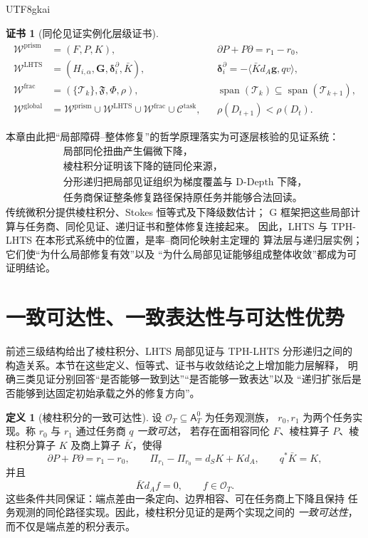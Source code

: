 \documentclass[12pt]{report}
\theoremstyle{definition}
\newtheorem{definition}{定义}[chapter]
\newtheorem{Certificate}{证书}[chapter]
\begin{document}
\begin{CJK*}{UTF8}{gkai}
\begin{Certificate}[同伦见证实例化层级证书]
\label{cert:witness-instance-hierarchy}
\[
\boxed{
\begin{aligned}
\mathcal W^{\mathrm{prism}}
&=(F,P,K),
&&\partial P+P\partial=r_1-r_0,\\
\mathcal W^{\mathrm{LHTS}}
&=(H_{i,\alpha},\mathbf G,\boldsymbol\delta_i^\partial,
   \bar K),
&&\boldsymbol\delta_i^\partial
  =-\langle\bar Kd_A\mathbf g,qv\rangle,\\
\mathcal W^{\mathrm{frac}}
&=(\{\mathcal T_k\},\mathfrak F,\Phi,\rho),
&&\operatorname{span}(\mathcal T_k)
  \subseteq\operatorname{span}(\mathcal T_{k+1}),\\
\mathcal W^{\mathrm{global}}
&=\mathcal W^{\mathrm{prism}}
  \cup\mathcal W^{\mathrm{LHTS}}
  \cup\mathcal W^{\mathrm{frac}}
  \cup\mathcal C^{\mathrm{task}},
&&\rho(D_{t+1})<\rho(D_t).
\end{aligned}}
\]
\end{Certificate}

本章由此把“局部障碍--整体修复”的哲学原理落实为可逐层核验的见证系统：
\[
\boxed{
\begin{gathered}
\text{局部同伦扭曲产生偏微下降，}
\\
\text{棱柱积分证明该下降的链同伦来源，}
\\
\text{分形递归把局部见证组织为梯度覆盖与 D-Depth 下降，}
\\
\text{任务商保证整条修复路径保持原任务并能够合法回读。}
\end{gathered}}
\]
传统微积分提供棱柱积分、Stokes 恒等式及下降级数估计；
G 框架把这些局部计算与任务商、同伦见证、递归证书和整体修复连接起来。
因此，LHTS 与 TPH-LHTS 在本形式系统中的位置，是率--商同伦映射主定理的
算法层与递归层实例；它们使“为什么局部修复有效”以及
“为什么局部见证能够组成整体收敛”都成为可证明结论。

\section{一致可达性、一致表达性与可达性优势}
\label{sec:consistent-reachability-expressivity-advantage}

前述三级结构给出了棱柱积分、LHTS 局部见证与 TPH-LHTS 分形递归之间的
构造关系。本节在这些定义、恒等式、证书与收敛结论之上增加能力层解释，
明确三类见证分别回答“是否能够一致到达”“是否能够一致表达”以及
“递归扩张后是否能够到达固定初始承载之外的修复方向”。

\begin{definition}[棱柱积分的一致可达性]
设 $\mathcal O_T\subseteq\mathsf A_T^0$ 为任务观测族，
$r_0,r_1$ 为两个任务实现。称 $r_0$ 与 $r_1$ 通过任务商 $q$ \emph{一致可达}，
若存在面相容同伦 $F$、棱柱算子 $P$、棱柱积分算子 $K$ 及商上算子
$\bar K$，使得
\[
\partial P+P\partial=r_1-r_0,
\qquad
\Pi_{r_1}-\Pi_{r_0}=d_SK+Kd_A,
\qquad
q^*\bar K=K,
\]
并且
\[
\bar Kd_Af=0,
\qquad f\in\mathcal O_T.
\]
这些条件共同保证：端点差由一条定向、边界相容、可在任务商上下降且保持
任务观测的同伦路径实现。因此，棱柱积分见证的是两个实现之间的
\emph{一致可达性}，而不仅是端点差的积分表示。
\end{definition}


\end{CJK*}
\end{document}
